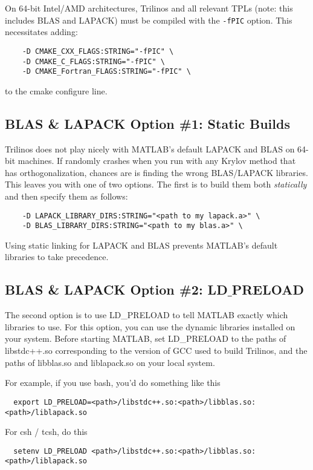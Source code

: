 On 64-bit Intel/AMD architectures, Trilinos and all relevant TPLs
(note: this includes BLAS and LAPACK)
must be compiled with the \texttt{-fPIC} option.  This necessitates adding:
\begin{lstlisting}
    -D CMAKE_CXX_FLAGS:STRING="-fPIC" \
    -D CMAKE_C_FLAGS:STRING="-fPIC" \
    -D CMAKE_Fortran_FLAGS:STRING="-fPIC" \
\end{lstlisting}
to the cmake configure line.

\subsection{BLAS \& LAPACK Option \#1: Static Builds}
Trilinos does not play nicely with MATLAB's default LAPACK and BLAS on
64-bit machines.
If \muemex randomly crashes when you run with any Krylov method that
has orthogonalization, chances are \muemex is finding the wrong
BLAS/LAPACK libraries.
This leaves you
with one of two options.  The first is to build them both \textit{statically}
and then specify them as follows:
\begin{lstlisting}
    -D LAPACK_LIBRARY_DIRS:STRING="<path to my lapack.a>" \
    -D BLAS_LIBRARY_DIRS:STRING="<path to my blas.a>" \
\end{lstlisting}
Using static linking for LAPACK and BLAS prevents MATLAB's default libraries to take precedence.

\subsection{BLAS \& LAPACK Option \#2: LD$\_$PRELOAD}
The second option is to use \textsf{LD\_PRELOAD} to tell MATLAB exactly
which libraries to use.  For this option, you can use the dynamic
libraries installed on your system.
Before starting MATLAB, set
LD\_PRELOAD to the paths of libstdc++.so corresponding to the version of GCC used
to build Trilinos, and the paths of libblas.so and liblapack.so on your local system.

For example, if you use bash, you'd do something like this
\begin{lstlisting}
  export LD_PRELOAD=<path>/libstdc++.so:<path>/libblas.so:<path>/liblapack.so
  \end{lstlisting}

For csh / tcsh, do this
\begin{lstlisting}
  setenv LD_PRELOAD <path>/libstdc++.so:<path>/libblas.so:<path>/liblapack.so
\end{lstlisting}

